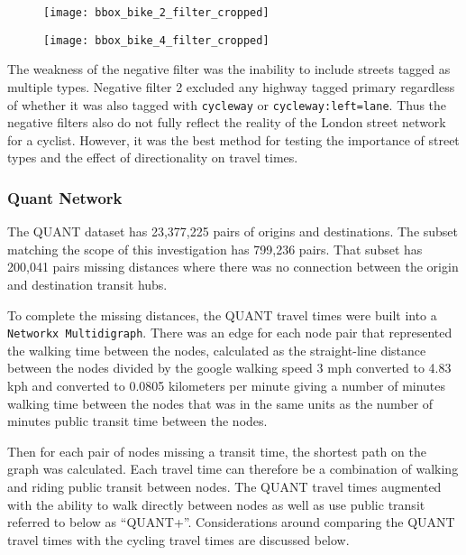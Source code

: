 \begin{figure}
\centering
\begin{minipage}{.5\textwidth}
  \centering
  \texttt{[image: bbox\_bike\_2\_filter\_cropped]}
  \label{fig:sub3}
\end{minipage}%
\begin{minipage}{.5\textwidth}
  \centering
  \texttt{[image: bbox\_bike\_4\_filter\_cropped]}
  \label{fig:sub4}
\end{minipage}
\end{figure}



The weakness of the negative filter was the inability to include streets tagged as multiple types. Negative filter 2 excluded any highway tagged primary regardless of whether it was also tagged with \texttt{cycleway} or \texttt{cycleway:left=lane}. Thus the negative filters also do not fully reflect the reality of the London street network for a cyclist. However, it was the best method for testing the importance of street types and the effect of directionality on travel times.  


\subsubsection{Quant Network}

The QUANT dataset has 23,377,225 pairs of origins and destinations. The subset matching the scope of this investigation has 799,236 pairs. That subset has 200,041 pairs missing distances where there was no connection between the origin and destination transit hubs.

To complete the missing distances, the QUANT travel times were built into a \texttt{Networkx Multidigraph}. There was an edge for each node pair that represented the walking time between the nodes, calculated as the straight-line distance between the nodes divided by the google walking speed 3 mph converted to 4.83 kph and converted to 0.0805 kilometers per minute giving a number of minutes walking time between the nodes that was in the same units as the number of minutes public transit time between the nodes. 

Then for each pair of nodes missing a transit time, the shortest path on the graph was calculated. Each travel time can therefore be a combination of walking and riding public transit between nodes. The QUANT travel times augmented with the ability to walk directly between nodes as well as use public transit referred to below as ``QUANT+''. Considerations around comparing the QUANT travel times with the cycling travel times are discussed below. 


